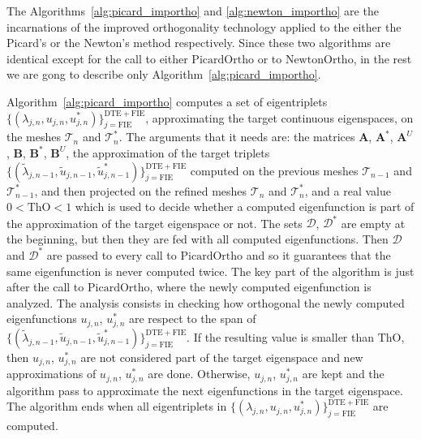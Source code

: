 \documentclass[preprint,12pt]{elsarticle}
\newcommand{\cT}{\mathcal{T}}
\begin{document}
The Algorithms~\ref{alg:picard_importho} and \ref{alg:newton_importho} are the incarnations of the improved orthogonality technology applied to the either the Picard's or the Newton's method respectively. Since these two algorithms are identical except for the call to either $\mathrm{PicardOrtho}$ or to $\mathrm{NewtonOrtho}$, in the rest we are gong to describe only Algorithm~\ref{alg:picard_importho}.

Algorithm~\ref{alg:picard_importho} computes a set of eigentriplets $\{(\lambda_{j,n},u_{j,n},u_{j,n}^*)\}_{j=\mathrm{FIE}}^{\mathrm{DTE}+\mathrm{FIE}}$, approximating the target continuous eigenspaces, on the meshes $\cT_n$ and $\cT_n^*$. The arguments that it needs are: the matrices $\mathbf{A}$, $\mathbf{A}^*$, $\mathbf{A}^U$, $\mathbf{B}$, $\mathbf{B}^*$, $\mathbf{B}^U$, the approximation of the target triplets $\{(\tilde\lambda_{j,n-1},\tilde u_{j,n-1},\tilde u_{j,n-1}^*)\}_{j=\mathrm{FIE}}^{\mathrm{DTE}+\mathrm{FIE}}$ computed on the previous meshes $\cT_{n-1}$ and $\cT_{n-1}^*$, and then projected on the refined meshes $\cT_n$ and $\cT_n^*$, and a real value $0<\mathrm{ThO}<1$ which is used to decide whether a computed eigenfunction is part of the approximation of the target eigenspace or not. The sets $\mathcal{D}$, $\mathcal{D}^*$ are empty at the beginning, but then they are fed with all computed eigenfunctions. Then $\mathcal{D}$ and $\mathcal{D}^*$ are passed to every call to $\mathrm{PicardOrtho}$ and so it guarantees that the same eigenfunction is never computed twice.
The key part of the algorithm is just after the call to $\mathrm{PicardOrtho}$, where the newly computed eigenfunction is analyzed. The analysis consists in checking how orthogonal the newly computed eigenfunctions $u_{j,n}$, $u_{j,n}^*$ are respect to the span of $\{(\tilde\lambda_{j,n-1},\tilde u_{j,n-1},\tilde u_{j,n-1}^*)\}_{j=\mathrm{FIE}}^{\mathrm{DTE}+\mathrm{FIE}}$. If the resulting value is smaller than $\mathrm{ThO}$, then $u_{j,n}$, $u_{j,n}^*$ are not considered part of the target eigenspace and new approximations of  $u_{j,n}$, $u_{j,n}^*$ are done. Otherwise, $u_{j,n}$, $u_{j,n}^*$ are kept and the algorithm pass to approximate the next eigenfunctions in the target eigenspace.
The algorithm ends when all eigentriplets in $\{(\lambda_{j,n},u_{j,n},u_{j,n}^*)\}_{j=\mathrm{FIE}}^{\mathrm{DTE}+\mathrm{FIE}}$ are computed.
\end{document}
